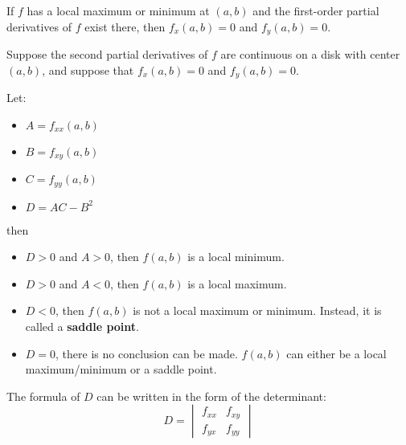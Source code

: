         \par If $f$ has a local maximum or minimum at $(a, b)$ and the first-order partial
        derivatives of $f$ exist there, then $f_{x}(a, b) = 0$ and $f_{y} (a, b) = 0$.
        
        \par Suppose the second partial derivatives of $f$ are continuous on a disk with center
        $(a, b)$, and suppose that $f_{x}(a, b) = 0$ and $f_{y}(a, b) = 0$.
        \par Let:
        \begin{itemize}
            \item $A = f_{xx}(a, b)$
            \item $B = f_{xy}(a, b)$
            \item $C = f_{yy}(a, b)$
            \item $D = AC - B^{2}$
        \end{itemize}
        then
        \begin{itemize}
            \item $D > 0$ and $A > 0$, then $f(a, b)$ is a local minimum.
            \item $D > 0$ and $A < 0$, then $f(a, b)$ is a local maximum.
            \item $D < 0$, then $f(a, b)$ is not a local maximum or minimum. Instead, it
                is called a \textbf{saddle point}.
            \item $D = 0$, there is no conclusion can be made. $f(a, b)$ can either be a
                local maximum/minimum or a saddle point.
        \end{itemize}
        \par The formula of $D$ can be written in the form of the determinant:
        \begin{equation}
            D = 
            \begin{vmatrix}
                f_{xx} & f_{xy} \\
                f_{yx} & f_{yy}
            \end{vmatrix}
        \end{equation}

